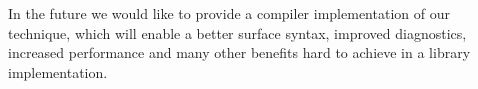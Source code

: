 
In the future we would like to provide a compiler implementation of our 
technique, which will enable a better surface syntax, improved diagnostics, 
increased performance and many other benefits hard to achieve in a library 
implementation.

%
%
%
%
%